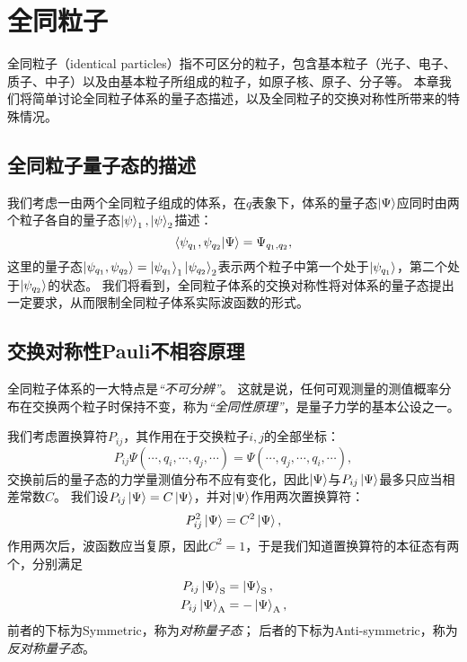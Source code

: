 
\section{全同粒子}
\label{sec:identical_particles}

全同粒子（identical particles）指不可区分的粒子，包含基本粒子（光子、电子、质子、中子）以及由基本粒子所组成的粒子，如原子核、原子、分子等。
本章我们将简单讨论全同粒子体系的量子态描述，以及全同粒子的交换对称性所带来的特殊情况。

\subsection{全同粒子量子态的描述}
\label{subsec:ip_state_desc}

我们考虑一由两个全同粒子组成的体系，在$q$表象下，体系的量子态$\ket{\Psi}$应同时由两个粒子各自的量子态$\ket{\psi}_1,\ket{\psi}_2$描述：
\begin{equation}
    \braket{\psi_{q_1},\psi_{q_2}}{\Psi} = \Psi_{q_1, q_2},
\end{equation}
这里的量子态$\ket{\psi_{q_1},\psi_{q_2}}=\ket{\psi_{q_1}}_1 \ket{\psi_{q_2}}_2$表示两个粒子中第一个处于$\ket{\psi_{q_1}}$，第二个处于$\ket{\psi_{q_2}}$的状态。
我们将看到，全同粒子体系的交换对称性将对体系的量子态提出一定要求，从而限制全同粒子体系实际波函数的形式。

\subsection{\texorpdfstring{交换对称性\quad Pauli不相容原理}{交换对称性  Pauli不相容原理}}
\label{subsec:ip_sym}

全同粒子体系的一大特点是\emph{“不可分辨”}。
这就是说，任何可观测量的测值概率分布在交换两个粒子时保持不变，称为\emph{“全同性原理”}，是量子力学的基本公设之一。

我们考虑置换算符$P_{ij}$，其作用在于交换粒子$i,j$的全部坐标：
\begin{equation}
    P_{ij}\Psi(\cdots,q_i,\cdots,q_j,\cdots) = \Psi(\cdots,q_j,\cdots,q_i,\cdots),
\end{equation}
交换前后的量子态的力学量测值分布不应有变化，因此$\ket{\Psi}$与$P_{ij}\ket{\Psi}$最多只应当相差常数$C$。
我们设$P_{ij}\ket{\Psi}=C\ket{\Psi}$，并对$\ket{\Psi}$作用两次置换算符：
\begin{equation}
    P_{ij}^2\ket{\Psi} = C^2 \ket{\Psi},
\end{equation}
作用两次后，波函数应当复原，因此$C^2=1$，于是我们知道置换算符的本征态有两个，分别满足
\begin{equation}
\begin{aligned}
    P_{ij}\ket{\Psi}_{\mathrm{S}} &=  \ket{\Psi}_{\mathrm{S}}, \\
    P_{ij}\ket{\Psi}_{\mathrm{A}} &= -\ket{\Psi}_{\mathrm{A}}, \\
\end{aligned}
\end{equation}
前者的下标为Symmetric，称为\emph{对称量子态}；
后者的下标为Anti-symmetric，称为\emph{反对称量子态}。

